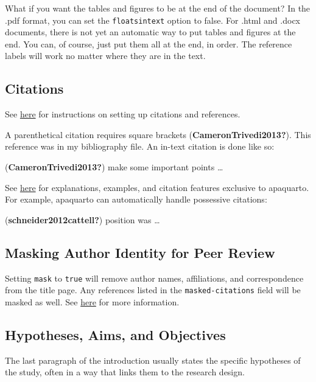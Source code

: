 \documentclass[
  man,
  longtable,
  nolmodern,
  notxfonts,
  notimes,
  colorlinks=true,linkcolor=blue,citecolor=blue,urlcolor=blue]{apa7}
\begin{document}
What if you want the tables and figures to be at the end of the
document? In the .pdf format, you can set the \texttt{floatsintext}
option to false. For .html and .docx documents, there is not yet an
automatic way to put tables and figures at the end. You can, of course,
just put them all at the end, in order. The reference labels will work
no matter where they are in the text.

\subsection{Citations}\label{citations}

See
\href{https://quarto.org/docs/authoring/footnotes-and-citations.html}{here}
for instructions on setting up citations and references.

A parenthetical citation requires square brackets
(\textbf{CameronTrivedi2013?}). This reference was in my bibliography
file. An in-text citation is done like so:

(\textbf{CameronTrivedi2013?}) make some important points \ldots{}

See
\href{https://wjschne.github.io/apaquarto/writing.html\#references}{here}
for explanations, examples, and citation features exclusive to
apaquarto. For example, apaquarto can automatically handle possessive
citations:

(\textbf{schneider2012cattell?}) position was \ldots{}

\subsection{Masking Author Identity for Peer
Review}\label{masking-author-identity-for-peer-review}

Setting \texttt{mask} to \texttt{true} will remove author names,
affiliations, and correspondence from the title page. Any references
listed in the \texttt{masked-citations} field will be masked as well.
See
\href{https://wjschne.github.io/apaquarto/writing.html\#masked-citations-for-anonymous-peer-review}{here}
for more information.

\subsection{Hypotheses, Aims, and
Objectives}\label{hypotheses-aims-and-objectives}

The last paragraph of the introduction usually states the specific
hypotheses of the study, often in a way that links them to the research
design.
\end{document}
